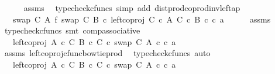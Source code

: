 \begin{isabellebody}
\ \ \ \ \isamarkupfalse%
\ assms\ \isamarkupfalse%
\ {\isacharparenleft}{\kern0pt}typecheck{\isacharunderscore}{\kern0pt}cfuncs{\isacharcomma}{\kern0pt}\ simp\ add{\isacharcolon}{\kern0pt}\ dist{\isacharunderscore}{\kern0pt}prod{\isacharunderscore}{\kern0pt}coprod{\isacharunderscore}{\kern0pt}inv{\isacharunderscore}{\kern0pt}left{\isacharunderscore}{\kern0pt}ap{\isacharparenright}{\kern0pt}\isanewline
\ \ \isamarkupfalse%
\ \isamarkupfalse%
\ {\isachardoublequoteopen}{\isachardot}{\kern0pt}{\isachardot}{\kern0pt}{\isachardot}{\kern0pt}\ {\isacharequal}{\kern0pt}\ {\isacharparenleft}{\kern0pt}{\isacharparenleft}{\kern0pt}swap\ C\ A\ {\isasymbowtie}\isactrlsub f\ swap\ C\ B{\isacharparenright}{\kern0pt}\ {\isasymcirc}\isactrlsub c\ left{\isacharunderscore}{\kern0pt}coproj\ {\isacharparenleft}{\kern0pt}C\ {\isasymtimes}\isactrlsub c\ A{\isacharparenright}{\kern0pt}\ {\isacharparenleft}{\kern0pt}C\ {\isasymtimes}\isactrlsub c\ B{\isacharparenright}{\kern0pt}{\isacharparenright}{\kern0pt}\ {\isasymcirc}\isactrlsub c\ {\isasymlangle}c{\isacharcomma}{\kern0pt}\ a{\isasymrangle}{\isachardoublequoteclose}\isanewline
\ \ \ \ \isamarkupfalse%
\ assms\ \isamarkupfalse%
\ {\isacharparenleft}{\kern0pt}typecheck{\isacharunderscore}{\kern0pt}cfuncs{\isacharcomma}{\kern0pt}\ smt\ comp{\isacharunderscore}{\kern0pt}associative{}{\isacharparenright}{\kern0pt}\isanewline
\ \ \isamarkupfalse%
\ \isamarkupfalse%
\ {\isachardoublequoteopen}{\isachardot}{\kern0pt}{\isachardot}{\kern0pt}{\isachardot}{\kern0pt}\ {\isacharequal}{\kern0pt}\ {\isacharparenleft}{\kern0pt}left{\isacharunderscore}{\kern0pt}coproj\ {\isacharparenleft}{\kern0pt}A\ {\isasymtimes}\isactrlsub c\ C{\isacharparenright}{\kern0pt}\ {\isacharparenleft}{\kern0pt}B\ {\isasymtimes}\isactrlsub c\ C{\isacharparenright}{\kern0pt}\ {\isasymcirc}\isactrlsub c\ swap\ C\ A{\isacharparenright}{\kern0pt}\ {\isasymcirc}\isactrlsub c\ {\isasymlangle}c{\isacharcomma}{\kern0pt}\ a{\isasymrangle}{\isachardoublequoteclose}\isanewline
\ \ \ \ \isamarkupfalse%
\ assms\ left{\isacharunderscore}{\kern0pt}coproj{\isacharunderscore}{\kern0pt}cfunc{\isacharunderscore}{\kern0pt}bowtie{\isacharunderscore}{\kern0pt}prod\ \isamarkupfalse%
\ {\isacharparenleft}{\kern0pt}typecheck{\isacharunderscore}{\kern0pt}cfuncs{\isacharcomma}{\kern0pt}\ auto{\isacharparenright}{\kern0pt}\isanewline
\ \ \isamarkupfalse%
\ \isamarkupfalse%
\ {\isachardoublequoteopen}{\isachardot}{\kern0pt}{\isachardot}{\kern0pt}{\isachardot}{\kern0pt}\ {\isacharequal}{\kern0pt}\ left{\isacharunderscore}{\kern0pt}coproj\ {\isacharparenleft}{\kern0pt}A\ {\isasymtimes}\isactrlsub c\ C{\isacharparenright}{\kern0pt}\ {\isacharparenleft}{\kern0pt}B\ {\isasymtimes}\isactrlsub c\ C{\isacharparenright}{\kern0pt}\ {\isasymcirc}\isactrlsub c\ swap\ C\ A\ {\isasymcirc}\isactrlsub c\ {\isasymlangle}c{\isacharcomma}{\kern0pt}\ a{\isasymrangle}{\isachardoublequoteclose}\isanewline

\end{isabellebody}
